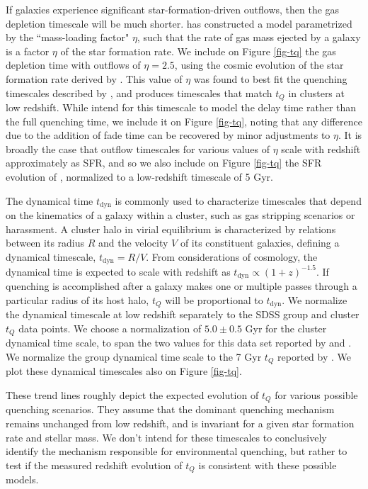 If galaxies experience significant star-formation-driven outflows, then the gas depletion timescale will be much shorter.
\citet{McGee:2014aa} has constructed a model parametrized by the ``mass-loading factor" $\eta$, such that the rate of gas mass ejected by a galaxy is a factor $\eta$ of the star formation rate.
We include on Figure \ref{fig-tq} the gas depletion time with outflows of $\eta=2.5$, using the cosmic evolution of the star formation rate derived by \citet{Whitaker:2012aa}.
This value of $\eta$ was found to best fit the quenching timescales described by \citet{McGee:2014aa}, and produces timescales that match $t_Q$ in clusters at low redshift.
While \citet{McGee:2014aa} intend for this timescale to model the delay time rather than the full quenching time, we include it on Figure \ref{fig-tq}, noting that any difference due to the addition of fade time can be recovered by minor adjustments to $\eta$.
It is broadly the case that outflow timescales for various values of $\eta$ scale with redshift approximately as SFR, and so we also include on Figure \ref{fig-tq} the SFR evolution of \citet{Whitaker:2012aa}, normalized to a low-redshift timescale of 5 Gyr.

The dynamical time $t_{\mathrm{dyn}}$ is commonly used to characterize timescales that depend on the kinematics of a galaxy within a cluster, such as gas stripping scenarios or harassment.
A cluster halo in virial equilibrium is characterized by relations between its radius $R$ and the velocity $V$ of its constituent galaxies, defining a dynamical timescale, $t_{\mathrm{dyn}}=R/V$.
From considerations of cosmology, the dynamical time is expected to scale with redshift as $t_{\mathrm{dyn}} \propto (1+z)^{-1.5}$.
If quenching is accomplished after a galaxy makes one or multiple passes through a particular radius of its host halo, $t_Q$ will be proportional to $t_{\mathrm{dyn}}$.
We normalize the dynamical timescale at low redshift separately to the SDSS group and cluster $t_Q$ data points.
We choose a normalization of $5.0\pm0.5$ Gyr for the cluster dynamical time scale, to span the two values for this data set reported by \citep{Wetzel:2013aa} and \citep{Balogh:2016aa}.
We normalize the group dynamical time scale to the 7 Gyr $t_Q$ reported by \citep{Balogh:2016aa}.
We plot these dynamical timescales also on Figure \ref{fig-tq}.

These trend lines roughly depict the expected evolution of $t_Q$ for various possible quenching scenarios.
They assume that the dominant quenching mechanism remains unchanged from low redshift, and is invariant for a given star formation rate and stellar mass.
We don't intend for these timescales to conclusively identify the mechanism responsible for environmental quenching, but rather to test if the measured redshift evolution of $t_Q$ is consistent with these possible models.

